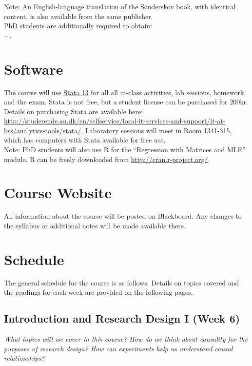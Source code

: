\documentclass[11pt,a4paper]{article}
\newcommand{\reading}[2][]{\noindent -- {#1}\bibentry{#2}.\vspace{.25em}\\}
\begin{document}
\noindent Note: An English-language translation of the S{\o}nderskov book, with identical content, is also available from the same publisher.\\

\noindent PhD students are additionally required to obtain:\\
\reading{Fox2009}

\section{Software}
The course will use \href{http://www.stata.com/}{Stata 13} for all all in-class activities, lab sessions, homework, and the exam. Stata is not free, but a student license can be purchased for 200kr. Details on purchasing Stata are available here: \href{http://studerende.au.dk/en/selfservice/local-it-services-and-support/it-at-bss/analytics-tools/stata/}{http://studerende.au.dk/en/selfservice/local-it-services-and-support/it-at-bss/analytics-tools/stata/}. Laboratory sessions will meet in Room 1341-315, which has computers with Stata available for free use.\\

Note: PhD students will also use R for the ``Regression with Matrices and MLE'' module. R can be freely downloaded from \href{http://cran.r-project.org/}{http://cran.r-project.org/}.

\section{Course Website}
All information about the course will be posted on Blackboard. Any changes to the syllabus or additional notes will be made available there.





\clearpage
\section{Schedule}
The general schedule for the course is as follows. Details on topics covered and the readings for each week are provided on the following pages.

\secttoc

\clearpage

\subsection{Introduction and Research Design I (Week 6)}
\emph{What topics will we cover in this course? How do we think about causality for the purposes of research design? How can experiments help us understand causal relationships?}
\end{document}
